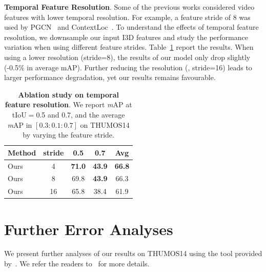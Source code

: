\noindent \textbf{Temporal Feature Resolution}. Some of the previous works considered video features with lower temporal resolution. For example, a feature stride of 8 was used by PGCN~\cite{pgcniccv2019} and ContextLoc~\cite{contextlociccv2021}. To understand the effects of temporal feature resolution, we downsample our input I3D features and study the performance variation when using different feature strides. Table~\ref{ablation5} report the results. When using a lower resolution (stride=8), the results of our model only drop slightly (-0.5\% in average mAP). Further reducing the resolution (\eg, stride=16) leads to larger performance degradation, yet our results remains favourable. 

\begin{table}[th!]
\caption{\label{ablation5}\textbf{Ablation study on temporal feature resolution}. We report \textit{m}AP at tIoU$=$0.5 and 0.7, and the average \textit{m}AP in $[0.3:0.1:0.7]$ on THUMOS14 by varying the feature stride.}
\centering
{
\setlength{\tabcolsep}{2.5pt}
  \begin{tabular}{l|c|c|c|c}
  Method  & stride & 0.5           & 0.7           & Avg          \\
  \hline
  Ours    & 4     &  \textbf{71.0}  & \textbf{43.9}  & \textbf{66.8}    \\
  Ours    & 8     & 69.8   & \textbf{43.9}  & 66.3    \\
  Ours    & 16    & 65.8   & 38.4  & 61.9  \\
  \end{tabular}
}
\end{table}


\section{Further Error Analyses}\label{sec:appendix:error_analysis}
We present further analyses of our results on THUMOS14 using the tool provided by~\cite{detadeccv2018}. We refer the readers to~\cite{detadeccv2018} for more details.\medskip

